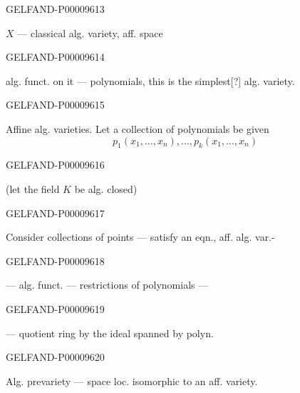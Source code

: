 \begin{GelfandAdjacentEvidence}{GELFAND-P000096}{13}

$X$ — classical alg. variety, aff. space
\end{GelfandAdjacentEvidence}
\begin{GelfandAdjacentEvidence}{GELFAND-P000096}{14}

alg. funct. on it — polynomials, this is the simplest[?]
alg. variety.
\end{GelfandAdjacentEvidence}
\begin{GelfandAdjacentEvidence}{GELFAND-P000096}{15}

Affine alg. varieties. Let a collection
of polynomials be given
\begin{equation*}p_1(x_1,\ldots,x_n),\ldots,p_k(x_1,\ldots,x_n)\end{equation*}
\end{GelfandAdjacentEvidence}
\begin{GelfandAdjacentEvidence}{GELFAND-P000096}{16}

(let the field $K$ be alg. closed)
\end{GelfandAdjacentEvidence}
\begin{GelfandAdjacentEvidence}{GELFAND-P000096}{17}

Consider collections of points — satisfy an eqn., aff. alg. var.-
\end{GelfandAdjacentEvidence}
\begin{GelfandAdjacentEvidence}{GELFAND-P000096}{18}

— alg. funct. — restrictions of polynomials —
\end{GelfandAdjacentEvidence}
\begin{GelfandAdjacentEvidence}{GELFAND-P000096}{19}

— quotient ring by the ideal spanned by polyn.
\end{GelfandAdjacentEvidence}
\begin{GelfandAdjacentEvidence}{GELFAND-P000096}{20}

Alg. prevariety — space loc. isomorphic
to an aff. variety.
\end{GelfandAdjacentEvidence}




